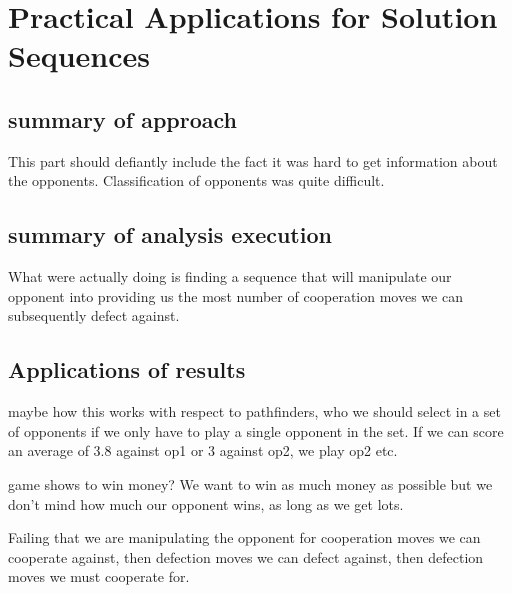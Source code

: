 \chapter{Practical Applications for Solution Sequences}\label{ch:conclusions}

\section{summary of approach}
This part should defiantly include the fact it was hard to get information about the opponents.
Classification of opponents was quite difficult.

\section{summary of analysis execution}
What were actually doing is finding a sequence that will manipulate our opponent into providing us the most number of cooperation moves we can subsequently defect against.

\section{Applications of results}
maybe how this works with respect to pathfinders, who we should select in a set of opponents if we only have to play a single opponent in the set.
If we can score an average of 3.8 against op1 or 3 against op2, we play op2 etc.

game shows to win money?
We want to win as much money as possible but we don't mind how much our opponent wins, as long as we get lots.

Failing that we are manipulating the opponent for cooperation moves we can cooperate against, then defection moves we can defect against, then defection moves we must cooperate for.

